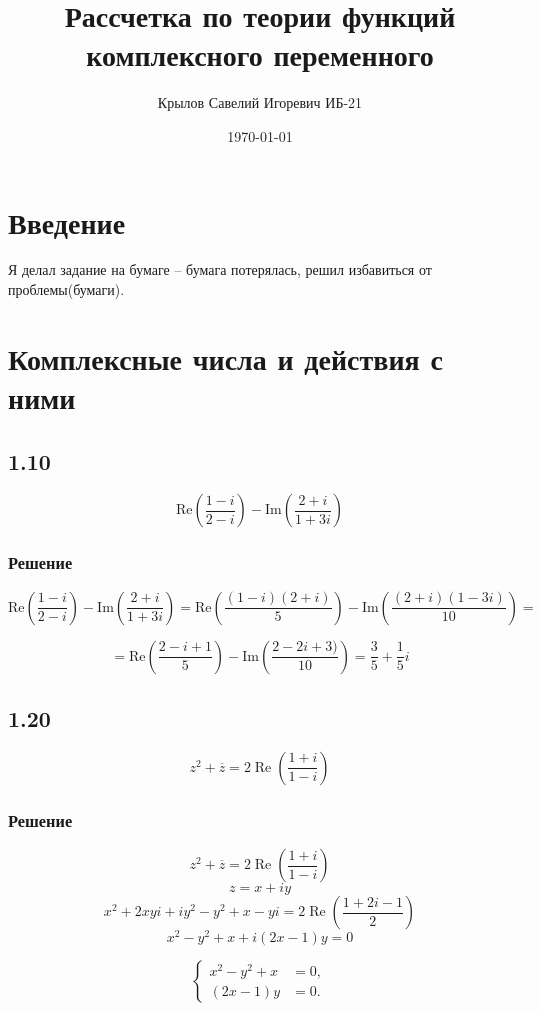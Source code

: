 \documentclass[12pt,a4paper]{article}
\title{Рассчетка по теории функций комплексного переменного}
\author{Крылов Савелий Игоревич ИБ-21}
\date{\today}
\begin{document}
\maketitle
\newpage

\renewcommand{\contentsname}{Оглавление}
\tableofcontents
\newpage

\section*{Введение}
Я делал задание на бумаге -- бумага потерялась, решил избавиться от проблемы(бумаги).

\section{Комплексные числа и действия с ними}
\subsection*{1.10}
\[
\text{Re} \left( \frac{1 - i}{2 - i} \right) - \text{Im} \left( \frac{2 + i}{1 + 3i} \right)
\]
\subsubsection*{Решение}
\[
\text{Re} \left( \frac{1-i}{2-i} \right) - \text{Im} \left( \frac{2+i}{1+3i} \right) = \text{Re} \left( \frac{(1-i)(2+i)}{5} \right) - \text{Im} \left( \frac{(2+i)(1-3i)}{10} \right) =
\]

\[
= \text{Re} \left( \frac{2-i+1}{5} \right) - \text{Im} \left( \frac{2-2i+3)}{10} \right) = \frac{3}{5}+\frac{1}{5}i
\]
\subsection*{1.20}
\[
z^2 + \overline{z} = 2\operatorname{Re} \left( \frac{1 + i}{1 - i} \right)
\]
\subsubsection*{Решение}
\[
z^2 + \overline{z} = 2 \operatorname{Re} \left( \frac{1+i}{1-i} \right)
\]
\[
z = x + iy
\]
\[
x^2 + 2xyi + iy^2 - y^2 + x - yi = 2 \operatorname{Re} \left( \frac{1+2i-1}{2} \right)
\]
\[
x^2 - y^2 + x + i(2x-1)y = 0
\]

\[
\left\{
\begin{aligned}
x^2 - y^2 + x &= 0, \\
(2x - 1) y &= 0.
\end{aligned}
\right.
\]
\end{document}
